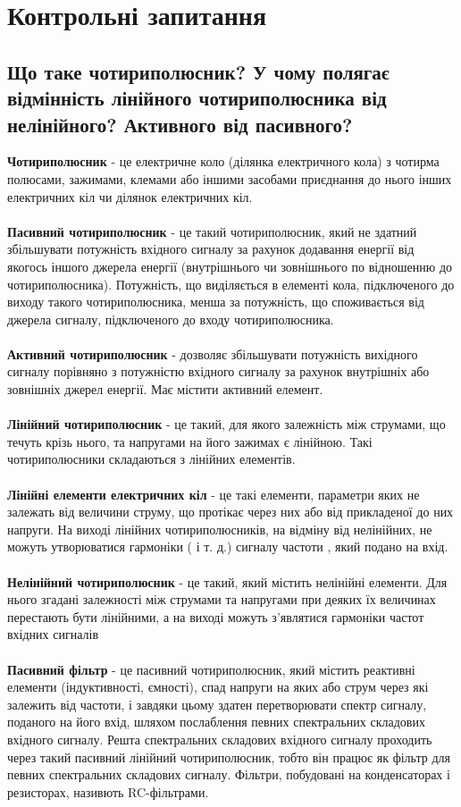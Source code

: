 \section{Контрольні запитання}
\subsection{Що таке чотириполюсник? У чому полягає відмінність лінійного чотириполюсника від нелінійного? Активного від пасивного?}
\indent \textbf{Чотириполюсник} - це електричне коло (ділянка електричного кола) з чотирма
полюсами, зажимами, клемами або іншими засобами приєднання до нього інших електричних кіл чи ділянок електричних кіл. \\~\\
\textbf{Пасивний чотириполюсник} - це такий чотириполюсник, який не здатний збільшувати потужність вхідного сигналу за рахунок додавання енергії від якогось іншого джерела енергії (внутрішнього чи зовнішнього по відношенню до чотириполюсника). Потужність, що виділяється в елементі кола, підключеного до виходу такого чотириполюсника, менша за потужність, що споживається від джерела сигналу, підключеного до входу чотириполюсника.\\~\\
\textbf{Активний чотириполюсник} - дозволяє збільшувати потужність вихідного сигналу порівняно з потужністю вхідного сигналу за рахунок внутрішніх або зовнішніх
джерел енергії. Має містити активний елемент.\\~\\
\textbf{Лінійний чотириполюсник} - це такий, для якого залежність між струмами, що течуть крізь нього, та напругами на його зажимах є лінійною. Такі чотириполюсники
складаються з лінійних елементів. \\~\\
\textbf{Лінійні елементи електричних кіл} - це такі елементи, параметри яких не залежать від величини струму, що протікає через них або від прикладеної до них напруги.
На виході лінійних чотириполюсників, на відміну від нелінійних, не можуть утворюватися гармоніки ( і т. д.) сигналу частоти , який подано на вхід.\\~\\
\textbf{Нелінійний чотириполюсник} - це такий, який містить нелінійні елементи.
Для нього згадані залежності між струмами та напругами при деяких їх величинах
перестають бути лінійними, а на виході можуть з’являтися гармоніки частот вхідних
сигналів\\~\\
\textbf{Пасивний фільтр} - це пасивний чотириполюсник, який містить реактивні
елементи (індуктивності, ємності), спад напруги на яких або струм через які залежить
від частоти, і завдяки цьому здатен перетворювати спектр сигналу, поданого на його вхід, шляхом послаблення певних спектральних складових вхідного сигналу. Решта
спектральних складових вхідного сигналу проходить через такий пасивний лінійний чотириполюсник, тобто він працює як фільтр для певних спектральних складових сигналу.
Фільтри, побудовані на конденсаторах і резисторах, називють RC-фільтрами.
